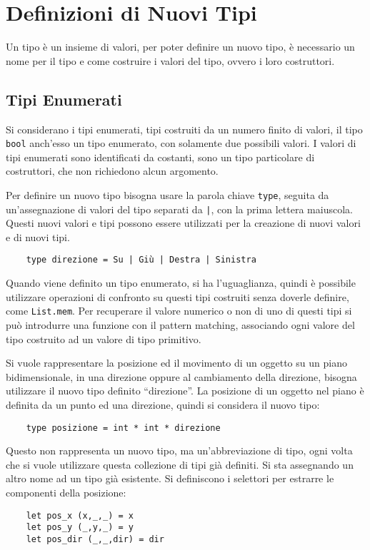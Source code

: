 \documentclass{article}
\numberwithin{equation}{subsection}
\begin{document}
\clearpage

\section{Definizioni di Nuovi Tipi}

Un tipo è un insieme di valori, per poter definire un nuovo tipo, è necessario un nome per il tipo e come costruire i valori del tipo, ovvero i loro costruttori. 

\subsection{Tipi Enumerati}

Si considerano i tipi enumerati, tipi costruiti da un numero finito di valori, il tipo \verb|bool| anch'esso un tipo enumerato, con solamente due possibili valori. I valori di tipi enumerati sono identificati da costanti, sono un tipo particolare di costruttori, che non richiedono alcun argomento. 

Per definire un nuovo tipo bisogna usare la parola chiave \verb|type|, seguita da un'assegnazione di valori del tipo separati da \texttt{|}, con la prima lettera maiuscola. Questi nuovi valori e tipi possono essere utilizzati per la creazione di nuovi valori e di nuovi tipi. 

\begin{verbatim}
    type direzione = Su | Giù | Destra | Sinistra
\end{verbatim}


Quando viene definito un tipo enumerato, si ha l'uguaglianza, quindi è possibile utilizzare operazioni di confronto su questi tipi costruiti senza doverle definire, come \verb|List.mem|. Per recuperare il valore numerico o non di uno di questi tipi si può introdurre una funzione con il pattern matching, associando ogni valore del tipo costruito ad un valore di tipo primitivo. 

Si vuole rappresentare la posizione ed il movimento di un oggetto su un piano bidimensionale, in una direzione oppure al cambiamento della direzione, bisogna utilizzare il nuovo tipo definito ``direzione''. La posizione di un oggetto nel piano è definita da un punto ed una direzione, quindi si considera il nuovo tipo:
\begin{verbatim}
    type posizione = int * int * direzione
\end{verbatim}
Questo non rappresenta un nuovo tipo, ma un'abbreviazione di tipo, ogni volta che si vuole utilizzare questa collezione di tipi già definiti. Si sta assegnando un altro nome ad un tipo già esistente. Si definiscono i selettori per estrarre le componenti della posizione:
\begin{verbatim}
    let pos_x (x,_,_) = x
    let pos_y (_,y,_) = y
    let pos_dir (_,_,dir) = dir    
\end{verbatim}
\end{document}
